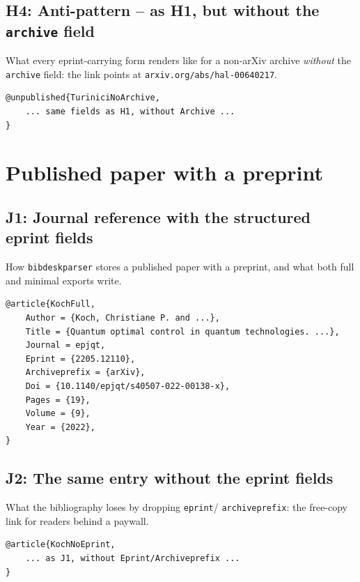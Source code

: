 \documentclass[onecolumn, amsmath, amssymb, aps, pra]{revtex4-2}
\begin{document}
\subsection{H4: Anti-pattern -- as H1, but without the \texttt{archive}
field~\cite{TuriniciNoArchive}}

What every eprint-carrying form renders like for a non-arXiv archive
\emph{without} the \texttt{archive} field: the link points at
\texttt{arxiv.org/abs/hal-00640217}.

\begin{Verbatim}
@unpublished{TuriniciNoArchive,
    ... same fields as H1, without Archive ...
}
\end{Verbatim}

\section{Published paper with a preprint}

\subsection{J1: Journal reference with the structured eprint
fields~\cite{KochFull}}

How \texttt{bibdeskparser} stores a published paper with a preprint, and
what both full and minimal exports write.

\begin{Verbatim}
@article{KochFull,
    Author = {Koch, Christiane P. and ...},
    Title = {Quantum optimal control in quantum technologies. ...},
    Journal = epjqt,
    Eprint = {2205.12110},
    Archiveprefix = {arXiv},
    Doi = {10.1140/epjqt/s40507-022-00138-x},
    Pages = {19},
    Volume = {9},
    Year = {2022},
}
\end{Verbatim}

\subsection{J2: The same entry without the eprint
fields~\cite{KochNoEprint}}

What the bibliography loses by dropping \texttt{eprint}/%
\texttt{archiveprefix}: the free-copy link for readers behind a paywall.

\begin{Verbatim}
@article{KochNoEprint,
    ... as J1, without Eprint/Archiveprefix ...
}
\end{Verbatim}
\end{document}
